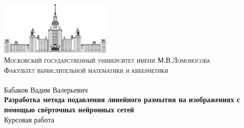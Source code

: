 \begin{titlepage}

\center %

{
\renewcommand{\headrulewidth}{0pt}
}

\thispagestyle{firststyle}



 \includegraphics[width=0.4\textwidth]{./pics/msu_logo}\\[0.2cm] %


\textsc{\small Московский государственный университет имени М.В.Ломоносова}\\ %
\textsc{\small Факультет вычислительной математики и кибернетики}\\ %
\textsc{\small  }\\[3cm] %

{
	Бабаков Вадим Валерьевич
} \\[1cm]
{ \Large \bfseries
	Разработка метода подавления линейного размытия на изображениях с помощью свёрточных нейронных сетей
} \\[1cm]
{ \Large
	Курсовая работа
}\\[2.5cm] %
 


\end{titlepage}
